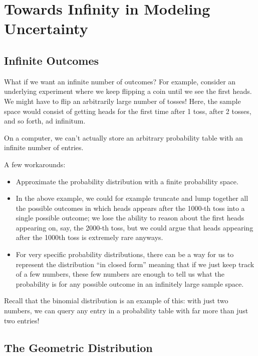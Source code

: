 \documentclass[6008notes.tex]{subfiles}
\begin{document}
\graphicspath{ {images/toinf/} }

\section{Towards Infinity in Modeling Uncertainty}

\subsection{Infinite Outcomes}

What if we want an infinite number of outcomes? For example, consider an underlying experiment where we keep flipping a coin until we see the first heads. We might have to flip an arbitrarily large number of tosses! Here, the sample space would consist of getting heads for the first time after 1 toss, after 2 tosses, and so forth, ad infinitum.

On a computer, we can't actually store an arbitrary probability table with an infinite number of entries.

A few workarounds:

\begin{itemize}
\item Approximate the probability distribution with a finite probability space.

\item In the above example, we could for example truncate and lump together all the possible outcomes in which heads appears after the 1000-th toss into a single possible outcome; we lose the ability to reason about the first heads appearing on, say, the 2000-th toss, but we could argue that heads appearing after the 1000th toss is extremely rare anyways.

\item For very specific probability distributions, there can be a way for us to represent the distribution ``in closed form'' meaning that if we just keep track of a few numbers, these few numbers are enough to tell us what the probability is for any possible outcome in an infinitely large sample space.
\end{itemize}

Recall that the binomial distribution is an example of this: with just two numbers, we can query any entry in a probability table with far more than just two entries!

\subsection{The Geometric Distribution}
\end{document}

